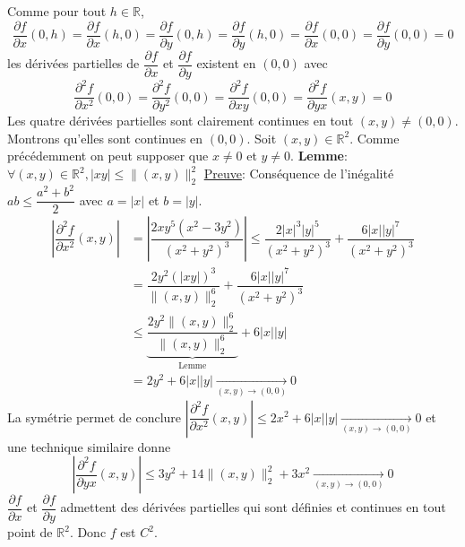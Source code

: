 \documentclass{fancybook}
\begin{document}
\begin{enumerate}
Comme pour tout $h\in \mathbb R$, $$\dfrac{\partial f}{\partial x}(0,h)=\dfrac{\partial f}{\partial x}(h,0)=\dfrac{\partial f}{\partial y}(0,h)=\dfrac{\partial f}{\partial y}(h,0)=\dfrac{\partial f}{\partial x}(0,0)=\dfrac{\partial f}{\partial y}(0,0)=0$$ les dérivées partielles de $\dfrac{\partial f}{\partial x}$ et  $\dfrac{\partial f}{\partial y}$ existent en $(0,0)$ avec $$\dfrac{\partial^2 f}{\partial x^2}(0,0)=\dfrac{\partial^2 f}{\partial y^2}(0,0)=\dfrac{\partial^2 f}{\partial xy}(0,0)=\dfrac{\partial^2 f}{\partial yx}(x,y)=0$$
\newline 
Les quatre dérivées partielles sont clairement continues en tout $(x,y)\neq (0,0)$. Montrons qu'elles sont continues en $(0,0)$. \newline
Soit $(x,y)\in \mathbb R^2$. Comme précédemment on peut supposer que $x\neq 0$ et $y\neq 0$.\newline
\newline
\textbf{Lemme}: $\forall (x,y)\in \mathbb R^2, |xy| \leq \|(x,y)\|_2^2$\newline
\underline{Preuve}: Conséquence de l'inégalité $ab\leq \dfrac{a^2+b^2}{2}$ avec $a=|x|$ et $b=|y|$.\newline
\newline
$$\begin{aligned}\left|\dfrac{\partial^2 f}{\partial x^2}(x,y)\right|&=\left|\dfrac{2 x y^5 \left(x^2-3 y^2\right)}{\left(x^2+y^2\right)^3}\right|\leq \dfrac{2|x|^3|y|^5}{(x^2+y^2)^3}+\dfrac{6|x||y|^7}{(x^2+y^2)^3}\\
&= \dfrac{2y^2 (|xy|)^3}{\|(x,y)\|_2^6} + \dfrac{6|x||y|^7}{(x^2+y^2)^3}\\
&{\leq} \underbrace{\dfrac{2y^2\|(x,y)\|_2^6}{\|(x,y)\|_2^6}}_{\text{Lemme}} + 6|x||y|\\
&=2y^2+ 6|x||y| \xrightarrow[(x,y)\to (0,0)]{}0
\end{aligned}$$
La symétrie permet de conclure $\left|\dfrac{\partial^2 f}{\partial x^2}(x,y)\right|\leq 2x^2+ 6|x||y| \xrightarrow[(x,y)\to (0,0)]{}0$ \newline et une technique similaire donne $$\left|\dfrac{\partial^2 f}{\partial yx}(x,y)\right|\leq 3y^2+ 14\|(x,y)\|_2^2+3x^2 \xrightarrow[(x,y)\to (0,0)]{}0$$
$\dfrac{\partial f}{\partial x}$ et $\dfrac{\partial f}{\partial y}$ admettent des dérivées partielles qui sont définies et continues en tout point de $\mathbb R^2$. Donc $f$ est $C^2$.
\end{enumerate}
\end{document}
